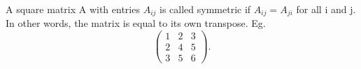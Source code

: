 A square matrix A with entries $A_{ij}$  is called symmetric if $A_{ij}=A_{ji}$  for all i and j. In other words, the matrix
is equal to its own transpose.
Eg. $$ 
\left ( 
\begin{array}{ccc} 
  1 & 2 & 3 \\
  2 & 4 & 5 \\
  3 & 5 & 6 
\end{array} 
\right ) . $$